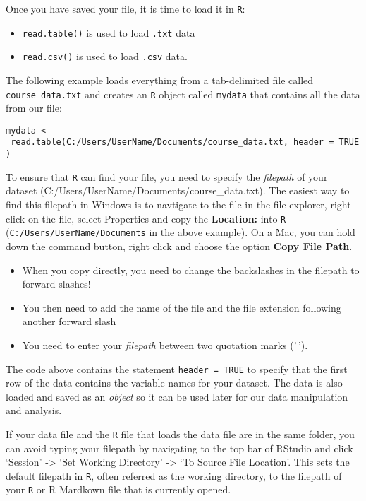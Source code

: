 \documentclass[
]{article}
\providecommand{\tightlist}{%
  \setlength{\itemsep}{0pt}\setlength{\parskip}{0pt}}
\begin{document}
Once you have saved your file, it is time to load it in \texttt{R}:

\begin{itemize}
\tightlist
\item
  \texttt{read.table()} is used to load \texttt{.txt} data
\item
  \texttt{read.csv()} is used to load \texttt{.csv} data.
\end{itemize}

The following example loads everything from a tab-delimited file called
\texttt{course\_data.txt} and creates an \texttt{R} object called
\texttt{mydata} that contains all the data from our file:

\texttt{mydata\ \textless{}-\ read.table(\textquotesingle{}C:/Users/UserName/Documents/course\_data.txt\textquotesingle{},\ header\ =\ TRUE)}

To ensure that \texttt{R} can find your file, you need to specify the
\emph{filepath} of your dataset
(C:/Users/UserName/Documents/course\_data.txt). The easiest way to find
this filepath in Windows is to navtigate to the file in the file
explorer, right click on the file, select Properties and copy the
\textbf{Location:} into \texttt{R} (\texttt{C:/Users/UserName/Documents}
in the above example). On a Mac, you can hold down the command button,
right click and choose the option \textbf{Copy File Path}.

\begin{itemize}
\item
  When you copy directly, you need to change the backslashes in the
  filepath to forward slashes!
\item
  You then need to add the name of the file and the file extension
  following another forward slash
\item
  You need to enter your \emph{filepath} between two quotation marks
  ('\,').
\end{itemize}

The code above contains the statement \texttt{header\ =\ TRUE} to
specify that the first row of the data contains the variable names for
your dataset. The data is also loaded and saved as an \emph{object} so
it can be used later for our data manipulation and analysis.

If your data file and the \texttt{R} file that loads the data file are
in the same folder, you can avoid typing your filepath by navigating to
the top bar of RStudio and click `Session' -\textgreater{} `Set Working
Directory' -\textgreater{} `To Source File Location'. This sets the
default filepath in \texttt{R}, often referred as the working directory,
to the filepath of your \texttt{R} or R Mardkown file that is currently
opened.
\end{document}
